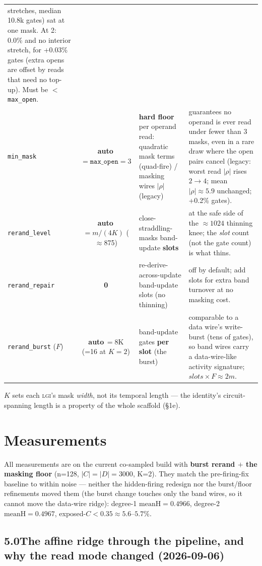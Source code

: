 \documentclass[11pt]{article}
\newcommand{\doc}[1]{\texttt{#1}}
\newcommand{\lgi}{\textsc{lgi}}
\begin{document}
\begin{table}[H]
\begin{tabular}{@{}lcL{3.4cm}L{5.0cm}@{}}
  stretches, median 10.8k gates) sat at one mask. At 2: 0.0\% and no interior stretch, for
  +0.03\% gates (extra opens are offset by reads that need no top-up). Must be
  $<$ \doc{max\_open}. \\
\addlinespace
\doc{min\_mask} & \textbf{auto\,$=\doc{max\_open}=3$} & \textbf{hard floor} per
  operand read: quadratic mask terms (quad-fire) / masking wires $|\rho|$ (legacy)
  & guarantees no operand is ever read under fewer than 3 masks, even in a rare draw
  where the open pairs cancel (legacy: worst read $|\rho|$ rises $2\to4$; mean
  $|\rho|\approx5.9$ unchanged; +0.2\% gates). \\
\addlinespace
\doc{rerand\_level} & \textbf{auto\,$=m/(4K)$} ($\approx$875) &
  close-straddling-masks band-update \textbf{slots} & at the safe side of the
  $\approx1024$ thinning knee; the \emph{slot} count (not the gate count) is what
  thins. \\
\addlinespace
\doc{rerand\_repair} & \textbf{0} & re-derive-across-update band-update slots (no
  thinning) & off by default; add slots for extra band turnover at no masking cost.
  \\
\addlinespace
\doc{rerand\_burst} ($F$) & \textbf{auto\,$=8\mathrm{K}$} (=16 at $K{=}2$) &
  band-update gates \textbf{per slot} (the burst) & comparable to a data wire's
  write-burst (tens of gates), so band wires carry a data-wire-like activity
  signature; $\mathit{slots}\times F\approx2m$. \\
\bottomrule
\end{tabular}
\end{table}
\noindent $K$ sets each \lgi's mask \emph{width}, not its temporal length --- the
identity's circuit-spanning length is a property of the whole scaffold (\S1e).

\section{Measurements}

All measurements are on the current co-sampled build with \textbf{burst rerand $+$
the masking floor} (n=128, $|C|=|D|=3000$, K=2). They match the pre-firing-fix
baseline to within noise --- neither the hidden-firing redesign nor the burst/floor
refinements moved them (the burst change touches only the band wires, so it cannot
move the data-wire ridge): degree-1 $\mathrm{meanH}=0.4966$, degree-2
$\mathrm{meanH}=0.4967$, exposed-$C<0.35\approx5.6$--$5.7\%$.

\subsection*{5.0\quad The affine ridge through the pipeline, and why the read mode changed (2026-09-06)}
\end{document}
